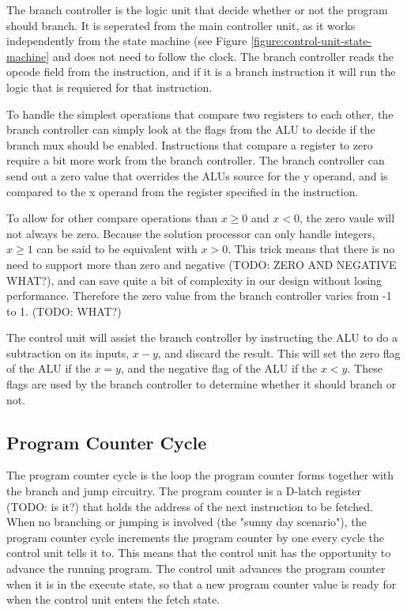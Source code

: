 The branch controller is the logic unit that decide whether or not the program should branch.
It is seperated from the main controller unit, as it works independently from the state machine (see Figure \ref{figure:control-unit-state-machine} and does not need to follow the clock.
The branch controller reads the opcode field from the instruction, and if it is a branch instruction it will run the logic that is requiered for that instruction.

To handle the simplest operations that compare two registers to each other, the branch controller can simply look at the flags from the ALU to decide if the branch mux should be enabled.
Instructions that compare a register to zero require a bit more work from the branch controller.
The branch controller can send out a zero value that overrides the ALUs source for the y operand, and is compared to the x operand from the register specified in the instruction.

To allow for other compare operations than $x \geq 0$ and $x < 0$, the zero vaule will not always be zero. 
Because the solution processor can only handle integers, $x \geq 1$ can be said to be equivalent with $x > 0$.
This trick means that there is no need to support more than zero and negative (TODO: ZERO AND NEGATIVE WHAT?), and can save quite a bit of complexity in our design without losing performance.
Therefore the zero value from the branch controller varies from -1 to 1. (TODO: WHAT?)

The control unit will assist the branch controller by instructing the ALU to do a subtraction on its inputs, $x - y$, and discard the result.
This will set the zero flag of the ALU if the $x = y$, and the negative flag of the ALU if the $x < y$.
These flags are used by the branch controller to determine whether it should branch or not.

\subsection{Program Counter Cycle}

The program counter cycle is the loop the program counter forms together with the branch and jump circuitry.
The program counter is a D-latch register (TODO: is it?) that holds the address of the next instruction to be fetched.
When no branching or jumping is involved (the "sunny day scenario"), the program counter cycle increments the program counter by one every cycle the control unit tells it to.
This means that the control unit has the opportunity to advance the running program.
The control unit advances the program counter when it is in the execute state, so that a new program counter value is ready for when the control unit enters the fetch state.

